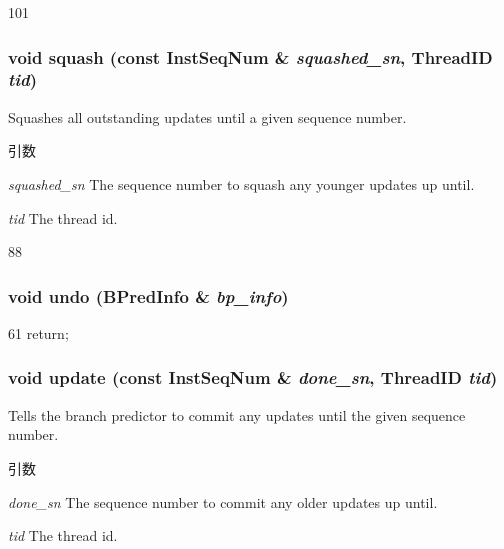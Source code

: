 \begin{DoxyCode}
101     { }
\end{DoxyCode}
\hypertarget{classNullPredictor_af62f441ad740da2cd987637cfa87dfe5}{
\subsubsection[{squash}]{\setlength{\rightskip}{0pt plus 5cm}void squash (const {\bf InstSeqNum} \& {\em squashed\_\-sn}, \/  {\bf ThreadID} {\em tid})}}
\label{classNullPredictor_af62f441ad740da2cd987637cfa87dfe5}
Squashes all outstanding updates until a given sequence number. 
\begin{DoxyParams}{引数}
\item[{\em squashed\_\-sn}]The sequence number to squash any younger updates up until. \item[{\em tid}]The thread id. \end{DoxyParams}



\begin{DoxyCode}
88 { }
\end{DoxyCode}
\hypertarget{classNullPredictor_af8b54e1aafc0215a1ea8efd67adef042}{
\subsubsection[{undo}]{\setlength{\rightskip}{0pt plus 5cm}void undo ({\bf BPredInfo} \& {\em bp\_\-info})}}
\label{classNullPredictor_af8b54e1aafc0215a1ea8efd67adef042}



\begin{DoxyCode}
61 { return; }
\end{DoxyCode}
\hypertarget{classNullPredictor_a6e4be480aeb0d4acfb352802ab73a3df}{
\subsubsection[{update}]{\setlength{\rightskip}{0pt plus 5cm}void update (const {\bf InstSeqNum} \& {\em done\_\-sn}, \/  {\bf ThreadID} {\em tid})}}
\label{classNullPredictor_a6e4be480aeb0d4acfb352802ab73a3df}
Tells the branch predictor to commit any updates until the given sequence number. 
\begin{DoxyParams}{引数}
\item[{\em done\_\-sn}]The sequence number to commit any older updates up until. \item[{\em tid}]The thread id. \end{DoxyParams}



